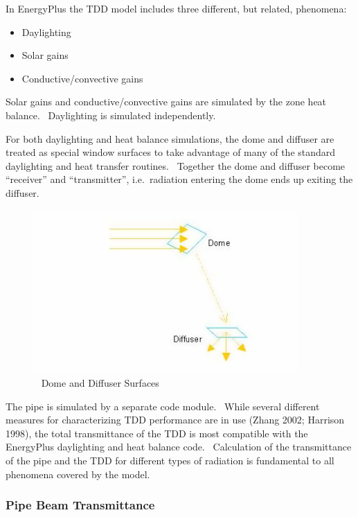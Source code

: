 In EnergyPlus the TDD model includes three different, but related, phenomena:

\begin{itemize}
\item
  Daylighting
\item
  Solar gains
\item
  Conductive/convective gains
\end{itemize}

Solar gains and conductive/convective gains are simulated by the zone heat balance.~ Daylighting is simulated independently.

For both daylighting and heat balance simulations, the dome and diffuser are treated as special window surfaces to take advantage of many of the standard daylighting and heat transfer routines.~ Together the dome and diffuser become ``receiver'' and ``transmitter'', i.e.~radiation entering the dome ends up exiting the diffuser.

\begin{figure}[hbtp] %
\centering
\includegraphics[width=0.9\textwidth, height=0.9\textheight, keepaspectratio=true]{media/image870.png}
\caption{  Dome and Diffuser Surfaces \protect \label{fig:dome-and-diffuser-surfaces}}
\end{figure}

The pipe is simulated by a separate code module.~ While several different measures for characterizing TDD performance are in use (Zhang 2002; Harrison 1998), the total transmittance of the TDD is most compatible with the EnergyPlus daylighting and heat balance code.~ Calculation of the transmittance of the pipe and the TDD for different types of radiation is fundamental to all phenomena covered by the model.

\subsubsection{Pipe Beam Transmittance}\label{pipe-beam-transmittance}

